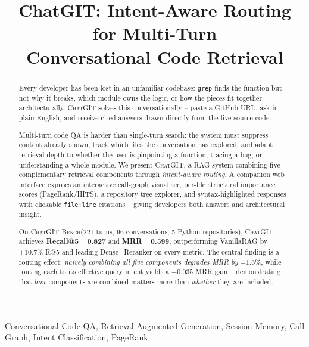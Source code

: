 \documentclass[conference]{IEEEtran}
\newcommand{\chatgit}{\textsc{ChatGIT}\xspace}
\newcommand{\conv}{\textsc{ChatGIT-Bench}\xspace}
\begin{document}
\title{ChatGIT: Intent-Aware Routing for Multi-Turn\\Conversational Code Retrieval}

\author{
}

\maketitle

\begin{abstract}
Every developer has been lost in an unfamiliar codebase: \texttt{grep}
finds the function but not why it breaks, which module owns the logic,
or how the pieces fit together architecturally. \chatgit solves this
conversationally -- paste a GitHub URL, ask in plain English, and receive
cited answers drawn directly from the live source code.

Multi-turn code QA is harder than single-turn search: the system must
suppress content already shown, track which files the conversation has
explored, and adapt retrieval depth to whether the user is pinpointing
a function, tracing a bug, or understanding a whole module. We present
\chatgit, a RAG system combining five complementary retrieval components
through \emph{intent-aware routing}. A companion web interface exposes
an interactive call-graph visualiser, per-file structural importance
scores (PageRank/HITS), a repository tree explorer, and syntax-highlighted
responses with clickable \texttt{file:line} citations -- giving
developers both answers and architectural insight.

On \conv (221 turns, 96 conversations, 5 Python repositories), \chatgit
achieves \textbf{Recall@5\,=\,0.827} and \textbf{MRR\,=\,0.599},
outperforming VanillaRAG by $+10.7\%$ R@5 and leading Dense+Reranker
on every metric. The central finding is a routing effect: \emph{naively
combining all five components degrades MRR by $-1.6\%$}, while routing
each to its effective query intent yields a $+0.035$ MRR gain --
demonstrating that \emph{how} components are combined matters more than
\emph{whether} they are included.
\end{abstract}

\begin{IEEEkeywords}
Conversational Code QA, Retrieval-Augmented Generation, Session Memory,
Call Graph, Intent Classification, PageRank
\end{IEEEkeywords}
\end{document}
